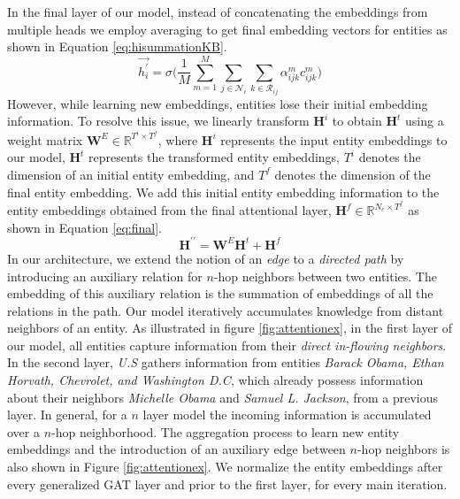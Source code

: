 \documentclass[11pt,a4paper]{article}
\begin{document}
In the final layer of our model, instead of concatenating the embeddings from multiple heads we employ averaging to get final embedding vectors for entities as shown in Equation \ref{eq:hisummationKB}.
\begin{equation}\label{eq:hisummationKB}
 \vec{h_{i}^{\prime}} =   \sigma \Bigg(\frac{1}{M}\sum_{m = 1}^{M}\sum_{j \in \mathcal{N}_{i}}\sum_{k \in \mathcal{R}_{ij}} \alpha_{ijk}^{m}c_{ijk}^{m} \Bigg)
\end{equation}
However, while learning new embeddings, entities lose their initial embedding information. To resolve this issue, we linearly transform \(\textbf{H}^i\) to obtain \(\textbf{H}^t\) using a weight matrix \(\textbf{W}^E \in \mathbb{R}^{T^i \times T^f}\), where \(\textbf{H}^i\) represents the input entity embeddings to our model, \(\textbf{H}^t\) represents the transformed entity embeddings, \(T^i\) denotes the dimension of an initial entity embedding, and \(T^f\) denotes the dimension of the final entity embedding. We add this initial entity embedding information to the entity embeddings obtained from the final attentional layer, \(\textbf{H}^f \in \mathbb{R}^{N_e \times T^f}\) as shown in Equation \ref{eq:final}.
\begin{equation}\label{eq:final}
 \textbf{H}^{\prime\prime} = \textbf{W}^E \textbf{H}^t + \textbf{H}^{f}
\end{equation}
In our architecture, we extend the notion of an \emph{edge} to a \emph{directed path}
by introducing an auxiliary relation for $n$-hop neighbors between two entities. 
The embedding of this auxiliary relation is the summation of embeddings of all the relations in the path.
Our model iteratively accumulates knowledge from distant neighbors of an entity. As illustrated in figure \ref{fig:attentionex}, in the first layer of our model, all entities capture information from their \emph{direct in-flowing neighbors}. In the second layer, \textit{U.S} gathers information from entities \textit{Barack Obama, Ethan Horvath, Chevrolet, and Washington D.C}, which already possess information about their neighbors \textit{Michelle Obama} and \textit{Samuel L. Jackson}, from a previous layer. In general, for a $n$ layer model the incoming information is accumulated over a $n$-hop neighborhood. The aggregation process to learn new entity embeddings and the introduction of an auxiliary edge between $n$-hop neighbors is also shown in Figure \ref{fig:attentionex}. We normalize the entity embeddings after every generalized GAT layer and prior to the first layer, for every main iteration.
\end{document}
